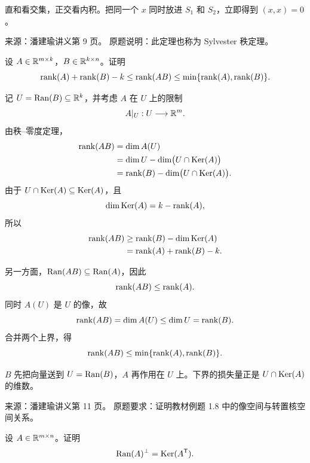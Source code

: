 \begin{dxtips}[直和的最短思路]\label{hw:matrix:tip1}
直和看交集，正交看内积。把同一个 $x$ 同时放进 $S_1$ 和 $S_2$，立即得到 $(x,x)=0$。
\end{dxtips}

\begin{homework}
\par\smallskip\textsf{来源：潘建瑜讲义第 9 页。}
原题说明：此定理也称为 Sylvester 秩定理。\par\smallskip

设 $A\in\mathbb{R}^{m\times k}$，$B\in\mathbb{R}^{k\times n}$。证明
\[
\operatorname{rank}(A)+\operatorname{rank}(B)-k
\le \operatorname{rank}(AB)
\le \min\{\operatorname{rank}(A),\operatorname{rank}(B)\}.
\]
\end{homework}

\begin{solution}
记 $U=\operatorname{Ran}(B)\subseteq\mathbb{R}^k$，并考虑 $A$ 在 $U$ 上的限制
\[
A|_U:U\longrightarrow\mathbb{R}^m.
\]
由秩--零度定理，
\begin{align*}
\operatorname{rank}(AB)
&=\dim A(U)\\
&=\dim U-\dim\bigl(U\cap\operatorname{Ker}(A)\bigr)\\
&=\operatorname{rank}(B)-\dim\bigl(U\cap\operatorname{Ker}(A)\bigr).
\end{align*}
由于 $U\cap\operatorname{Ker}(A)\subseteq\operatorname{Ker}(A)$，且
\[
\dim\operatorname{Ker}(A)=k-\operatorname{rank}(A),
\]
所以
\begin{align*}
\operatorname{rank}(AB)
&\ge \operatorname{rank}(B)-\dim\operatorname{Ker}(A)\\
&=\operatorname{rank}(A)+\operatorname{rank}(B)-k.
\end{align*}

另一方面，$\operatorname{Ran}(AB)\subseteq\operatorname{Ran}(A)$，因此
\[
\operatorname{rank}(AB)\le\operatorname{rank}(A).
\]
同时 $A(U)$ 是 $U$ 的像，故
\[
\operatorname{rank}(AB)=\dim A(U)\le\dim U=\operatorname{rank}(B).
\]
合并两个上界，得
\[
\operatorname{rank}(AB)\le\min\{\operatorname{rank}(A),\operatorname{rank}(B)\}.
\]
\end{solution}

\begin{dxtips}[秩就是像空间的维数]\label{hw:matrix:tip2}
$B$ 先把向量送到 $U=\operatorname{Ran}(B)$，$A$ 再作用在 $U$ 上。下界的损失量正是 $U\cap\operatorname{Ker}(A)$ 的维数。
\end{dxtips}

\begin{homework}[第 3 题：例题 1.8]
\par\smallskip\textsf{来源：潘建瑜讲义第 11 页。}
原题要求：证明教材例题 1.8 中的像空间与转置核空间关系。\par\smallskip

设 $A\in\mathbb{R}^{m\times n}$。证明
\[
\operatorname{Ran}(A)^\perp=\operatorname{Ker}(A^{\mathsf T}).
\]
\end{homework}


